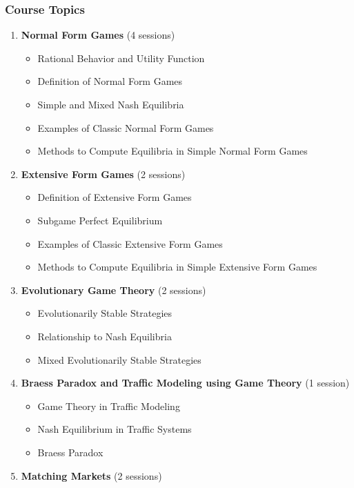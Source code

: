 \documentclass[12pt]{article}
\begin{document}
\subsubsection*{Course Topics}
\begin{enumerate}
    \item \textbf{Normal Form Games} (4 sessions)
    \begin{itemize}
        \item Rational Behavior and Utility Function
        \item Definition of Normal Form Games
        \item Simple and Mixed Nash Equilibria
        \item Examples of Classic Normal Form Games
        \item Methods to Compute Equilibria in Simple Normal Form Games
    \end{itemize}
    \item \textbf{Extensive Form Games} (2 sessions)
    \begin{itemize}
        \item Definition of Extensive Form Games
        \item Subgame Perfect Equilibrium
        \item Examples of Classic Extensive Form Games
        \item Methods to Compute Equilibria in Simple Extensive Form Games
    \end{itemize}
    \item \textbf{Evolutionary Game Theory} (2 sessions)
    \begin{itemize}
        \item Evolutionarily Stable Strategies
        \item Relationship to Nash Equilibria
        \item Mixed Evolutionarily Stable Strategies
    \end{itemize}
    \item \textbf{Braess Paradox and Traffic Modeling using Game Theory} (1 session)
    \begin{itemize}
        \item Game Theory in Traffic Modeling
        \item Nash Equilibrium in Traffic Systems
        \item Braess Paradox
    \end{itemize}
    \item \textbf{Matching Markets} (2 sessions)
    \begin{itemize}

\end{itemize}
\end{enumerate}
\end{document}
